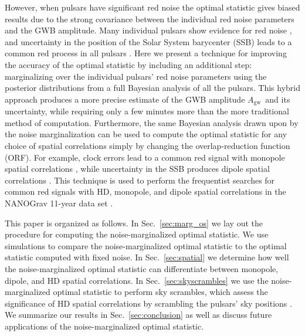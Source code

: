 \documentclass[twocolumn,aps,prd,superscriptaddress]{revtex4-1}
\newcommand{\Agw}{\ensuremath{A_\mathrm{gw}}}
\begin{document}
However, when pulsars have significant red noise 
the optimal statistic gives biased results 
due to the strong covariance 
between the individual red noise parameters and the GWB amplitude. 
Many individual pulsars show evidence for red noise \citep{lam+2017,abb+17}, 
and uncertainty in the position of the Solar System barycenter (SSB) leads to 
a common red process in all pulsars \citep{abb+17b}. 
Here we present a technique for improving the accuracy of the optimal statistic by including an additional step: 
marginalizing over the individual pulsars' red noise parameters 
using the posterior distributions from a full Bayesian analysis of all the pulsars. 
This hybrid approach produces a more precise estimate of the GWB amplitude \Agw\ 
and its uncertainty, while requiring only a few minutes more than the more traditional method of computation. 
Furthermore, the same Bayesian analysis drawn upon by the noise marginalization 
can be used to compute the optimal statistic for any choice of spatial correlations 
simply by changing the overlap-reduction function (ORF). 
For example, clock errors lead to a common red signal with monopole spatial correlations \citep{hcm+2012}, 
while uncertainty in the SSB produces dipole spatial correlations \citep{chm+2010}. 
This technique is used to perform the frequentist searches 
for common red signals with HD, 
monopole, and dipole spatial correlations 
in the NANOGrav 11-year data set \citep{abb+17b}.

This paper is organized as follows. In Sec.~\ref{sec:marg_os} 
we lay out the procedure for computing the noise-marginalized optimal statistic. 
We use simulations to compare the noise-marginalized optimal statistic 
to the optimal statistic computed with fixed noise. 
In Sec.~\ref{sec:spatial} we determine how well 
the noise-marginalized optimal statistic can 
differentiate between monopole, dipole, and HD spatial correlations. 
In Sec.~\ref{sec:skyscrambles} we use the noise-marginalized optimal statistic 
to perform sky scrambles, 
which assess the significance of HD spatial correlations 
by scrambling the pulsars' sky positions \citep{cs2016, tlb+2017}. 
We summarize our results in Sec.~\ref{sec:conclusion} 
as well as discuss future applications of the noise-marginalized optimal statistic.
\end{document}
